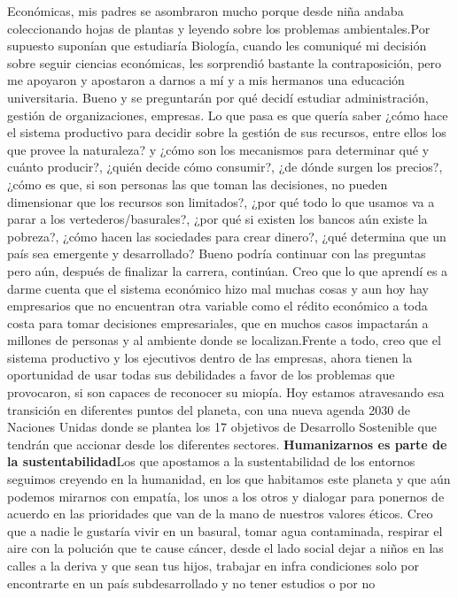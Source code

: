 \begin{fullwidth}
Económicas, mis padres se asombraron mucho porque desde niña andaba
coleccionando hojas de plantas y leyendo sobre los problemas
ambientales.Por supuesto suponían que estudiaría Biología, cuando les
comuniqué mi decisión sobre seguir ciencias económicas, les sorprendió
bastante la contraposición, pero me apoyaron y apostaron a darnos a mí y
a mis hermanos una educación universitaria. Bueno y se preguntarán por
qué decidí estudiar administración, gestión de organizaciones, empresas.
Lo que pasa es que quería saber ¿cómo hace el sistema productivo para
decidir sobre la gestión de sus recursos, entre ellos los que provee la
naturaleza? y ¿cómo son los mecanismos para determinar qué y cuánto
producir?, ¿quién decide cómo consumir?, ¿de dónde surgen los precios?,
¿cómo es que, si son personas las que toman las decisiones, no pueden
dimensionar que los recursos son limitados?, ¿por qué todo lo que usamos
va a parar a los vertederos/basurales?, ¿por qué si existen los bancos
aún existe la pobreza?, ¿cómo hacen las sociedades para crear dinero?,
¿qué determina que un país sea emergente y desarrollado? Bueno podría
continuar con las preguntas pero aún, después de finalizar la carrera,
continúan. Creo que lo que aprendí es a darme cuenta que el sistema
económico hizo mal muchas cosas y aun hoy hay empresarios que no
encuentran otra variable como el rédito económico a toda costa para
tomar decisiones empresariales, que en muchos casos impactarán a
millones de personas y al ambiente donde se localizan.Frente a todo,
creo que el sistema productivo y los ejecutivos dentro de las empresas,
ahora tienen la oportunidad de usar todas sus debilidades a favor de los
problemas que provocaron, si son capaces de reconocer su miopía. Hoy
estamos atravesando esa transición en diferentes puntos del planeta, con
una nueva agenda 2030 de Naciones Unidas donde se plantea los 17
objetivos de Desarrollo Sostenible que tendrán que accionar desde los
diferentes sectores. \textbf{Humanizarnos es parte de la
sustentabilidad}Los que apostamos a la sustentabilidad de los entornos
seguimos creyendo en la humanidad, en los que habitamos este planeta y
que aún podemos mirarnos con empatía, los unos a los otros y dialogar
para ponernos de acuerdo en las prioridades que van de la mano de
nuestros valores éticos. Creo que a nadie le gustaría vivir en un
basural, tomar agua contaminada, respirar el aire con la polución que te
cause cáncer, desde el lado social dejar a niños en las calles a la
deriva y que sean tus hijos, trabajar en infra condiciones solo por
encontrarte en un país subdesarrollado y no tener estudios o por no

\end{fullwidth}
